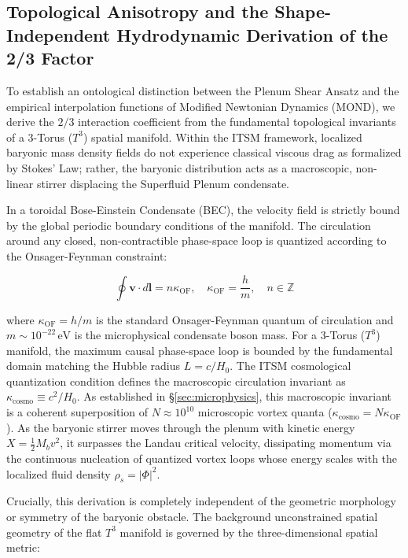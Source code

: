 \documentclass[aps,prd,10pt,twocolumn,superscriptaddress,nofootinbib,floatfix]{revtex4-2}
\begin{document}
\subsection{\label{sec:projection}Topological Anisotropy and the Shape-Independent Hydrodynamic Derivation of the 2/3 Factor}

To establish an ontological distinction between the Plenum Shear Ansatz and the empirical interpolation functions of Modified Newtonian Dynamics (MOND), we derive the $2/3$ interaction coefficient from the fundamental topological invariants of a 3-Torus ($T^3$) spatial manifold. Within the ITSM framework, localized baryonic mass density fields do not experience classical viscous drag as formalized by Stokes' Law; rather, the baryonic distribution acts as a macroscopic, non-linear stirrer displacing the Superfluid Plenum condensate.

In a toroidal Bose-Einstein Condensate (BEC), the velocity field is strictly bound by the global periodic boundary conditions of the manifold. The circulation around any closed, non-contractible phase-space loop is quantized according to the Onsager-Feynman constraint:

\begin{equation}
\oint \mathbf{v} \cdot d\mathbf{l} = n \kappa_{\text{OF}}, \quad \kappa_{\text{OF}} = \frac{h}{m}, \quad n \in \mathbb{Z}
\end{equation}

where $\kappa_{\text{OF}} = h/m$ is the standard Onsager-Feynman quantum of circulation and $m \sim 10^{-22}\,\text{eV}$ is the microphysical condensate boson mass. For a 3-Torus ($T^3$) manifold, the maximum causal phase-space loop is bounded by the fundamental domain matching the Hubble radius $L = c/H_0$. The ITSM cosmological quantization condition defines the macroscopic circulation invariant as $\kappa_{\text{cosmo}} \equiv c^2 / H_0$. As established in \S\ref{sec:microphysics}, this macroscopic invariant is a coherent superposition of $N \approx 10^{10}$ microscopic vortex quanta ($\kappa_{\text{cosmo}} = N \kappa_{\text{OF}}$). As the baryonic stirrer moves through the plenum with kinetic energy $X = \frac{1}{2}M_b v^2$, it surpasses the Landau critical velocity, dissipating momentum via the continuous nucleation of quantized vortex loops whose energy scales with the localized fluid density $\rho_s = |\Phi|^2$.

Crucially, this derivation is completely independent of the geometric morphology or symmetry of the baryonic obstacle. The background unconstrained spatial geometry of the flat $T^3$ manifold is governed by the three-dimensional spatial metric:
\end{document}
